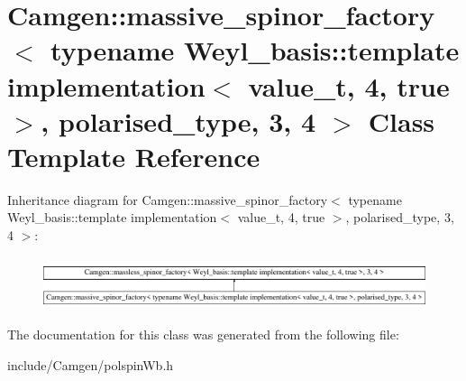 \hypertarget{a00350}{\section{Camgen\-:\-:massive\-\_\-spinor\-\_\-factory$<$ typename Weyl\-\_\-basis\-:\-:template implementation$<$ value\-\_\-t, 4, true $>$, polarised\-\_\-type, 3, 4 $>$ Class Template Reference}
\label{a00350}
}
Inheritance diagram for Camgen\-:\-:massive\-\_\-spinor\-\_\-factory$<$ typename Weyl\-\_\-basis\-:\-:template implementation$<$ value\-\_\-t, 4, true $>$, polarised\-\_\-type, 3, 4 $>$\-:\begin{figure}[H]
\begin{center}
\leavevmode
\includegraphics[height=1.538461cm]{a00350}
\end{center}
\end{figure}


The documentation for this class was generated from the following file\-:\begin{DoxyCompactItemize}
\item 
include/\-Camgen/polspin\-Wb.\-h\end{DoxyCompactItemize}
